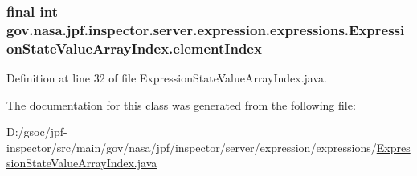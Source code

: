 \subsubsection[{\texorpdfstring{element\+Index}{elementIndex}}]{\setlength{\rightskip}{0pt plus 5cm}final int gov.\+nasa.\+jpf.\+inspector.\+server.\+expression.\+expressions.\+Expression\+State\+Value\+Array\+Index.\+element\+Index\hspace{0.3cm}{\ttfamily [private]}}\hypertarget{classgov_1_1nasa_1_1jpf_1_1inspector_1_1server_1_1expression_1_1expressions_1_1_expression_state_value_array_index_a90a2553f285ebf96b2572a89b99ec148}{}\label{classgov_1_1nasa_1_1jpf_1_1inspector_1_1server_1_1expression_1_1expressions_1_1_expression_state_value_array_index_a90a2553f285ebf96b2572a89b99ec148}


Definition at line 32 of file Expression\+State\+Value\+Array\+Index.\+java.



The documentation for this class was generated from the following file\+:\begin{DoxyCompactItemize}
\item 
D\+:/gsoc/jpf-\/inspector/src/main/gov/nasa/jpf/inspector/server/expression/expressions/\hyperlink{_expression_state_value_array_index_8java}{Expression\+State\+Value\+Array\+Index.\+java}\end{DoxyCompactItemize}
